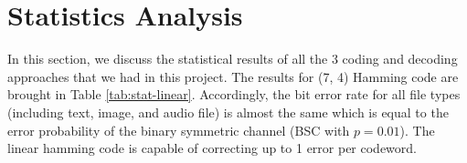 \documentclass{article}
\begin{document}
% 

% 

% 
% 
% 

% 

% 

\section{Statistics Analysis}

In this section, we discuss the statistical results of all the 3 coding and decoding approaches that we had in this project. 
The results for (7, 4) Hamming code are brought in Table \ref{tab:stat-linear}. 
Accordingly, the bit error rate for all file types (including text, image, and audio file) is almost the same which is equal to the error probability of the binary symmetric channel (BSC with $p = 0.01$). 
The linear hamming code is capable of correcting up to 1 error per codeword. 
\end{document}
